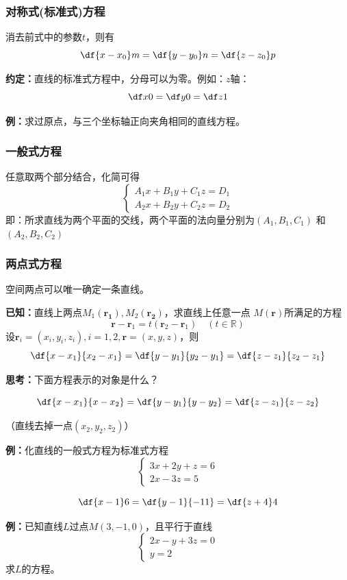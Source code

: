 \subsubsection{对称式(标准式)方程}

消去前式中的参数$t$，则有
$$
	{\df{x-x_0}m=\df{y-y_0}n=\df{z-z_0}p}
$$

{\bf 约定：}直线的标准式方程中，分母可以为零。例如：$z$轴：
$$\df x0=\df y0=\df z1$$

{\bf 例：}求过原点，与三个坐标轴正向夹角相同的直线方程。

\subsubsection{一般式方程}

任意取两个部分结合，化简可得
$$
	\left\{\begin{array}{l}
		A_1x+B_1y+C_1z=D_1\\
		A_2x+B_2y+C_2z=D_2
	\end{array}\right.
$$
即：所求直线为两个平面的交线，两个平面的法向量分别为$(A_1,B_1,C_1)$
和$(A_2,B_2,C_2)$

\subsubsection{两点式方程}

空间两点可以唯一确定一条直线。

{\bf 已知：}直线上两点$M_1(\bm{r_1}),M_2(\bm{r_2})$，求直线上任意一点
$M(\bm{r})$所满足的方程
$${\bm{r}-\bm{r}_1=t(\bm{r}_2-\bm{r}_1)\quad (t\in\mathbb{R})}$$ 
设$\bm{r}_i=(x_i,y_i,z_i),i=1,2,\bm{r}=(x,y,z)$，则
$${\df{x-x_1}{x_2-x_1}=\df{y-y_1}{y_2-y_1}=\df{z-z_1}{z_2-z_1}}$$

{\bf 思考：}下面方程表示的对象是什么？

$${\df{x-x_1}{x-x_2}=\df{y-y_1}{y-y_2}=\df{z-z_1}{z-z_2}}$$

\hfill （直线去掉一点$(x_2,y_2,z_2)$）

{\bf 例：}化直线的一般式方程为标准式方程
$$\left\{\begin{array}{l}
	3x+2y+z=6\\
	2x-3z=5
\end{array}\right.$$

$$\df{x-1}6=\df{y-1}{-11}=\df{z+4}4$$

{\bf 例：}已知直线$L$过点$M(3,-1,0)$，且平行于直线
$$\left\{\begin{array}{l}
	2x-y+3z=0\\
	y=2
\end{array}\right.$$
求$L$的方程。

